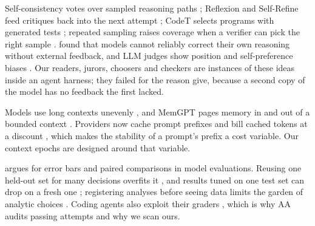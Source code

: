 Self-consistency votes over sampled reasoning
paths \citep{wang2023selfconsistency}; Reflexion and Self-Refine feed critiques back into the next
attempt \citep{shinn2023reflexion,madaan2023selfrefine}; CodeT selects programs with generated
tests \citep{chen2023codet}; repeated sampling raises coverage when a verifier can pick the right
sample \citep{brown2024monkeys,snell2025scaling}. \citet{huang2024cannot} found that models cannot
reliably correct their own reasoning without external feedback, and LLM judges show position and
self-preference biases \citep{zheng2023judge}. Our readers, jurors, choosers and checkers are
instances of these ideas inside an agent harness; they failed for the reason
\citeauthor{huang2024cannot} give, because a second copy of the model has no feedback the first
lacked.

 Models use long contexts unevenly \citep{liu2024lost}, and MemGPT pages
memory in and out of a bounded context \citep{packer2023memgpt}. Providers now cache prompt
prefixes and bill cached tokens at a discount \citep{openai2024caching}, which makes the
stability of a prompt's prefix a cost variable. Our context epochs are designed around that
variable.

 \citet{miller2024errorbars} argues for error bars and paired
comparisons in model evaluations. Reusing one held-out set for many decisions overfits it
\citep{dwork2015reusable}, and results tuned on one test set can drop on a fresh one
\citep{recht2019imagenet}; registering analyses before seeing data limits the garden of
analytic choices \citep{nosek2018prereg}. Coding agents also exploit their graders
\citep{metr2025rewardhacking}, which is why AA audits passing attempts and why we scan ours.
